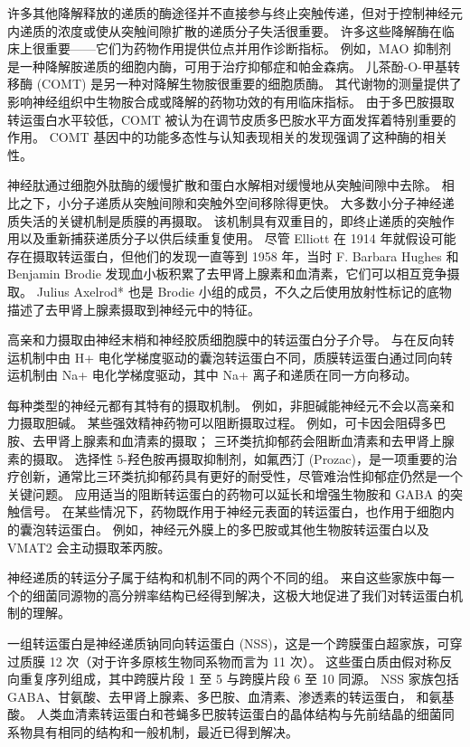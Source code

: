 许多其他降解释放的递质的酶途径并不直接参与终止突触传递，但对于控制神经元内递质的浓度或使从突触间隙扩散的递质分子失活很重要。 
许多这些降解酶在临床上很重要——它们为药物作用提供位点并用作诊断指标。 
例如，MAO 抑制剂是一种降解胺递质的细胞内酶，可用于治疗抑郁症和帕金森病。 
儿茶酚-O-甲基转移酶 (COMT) 是另一种对降解生物胺很重要的细胞质酶。 
其代谢物的测量提供了影响神经组织中生物胺合成或降解的药物功效的有用临床指标。 由于多巴胺摄取转运蛋白水平较低，COMT 被认为在调节皮质多巴胺水平方面发挥着特别重要的作用。 
COMT 基因中的功能多态性与认知表现相关的发现强调了这种酶的相关性。


神经肽通过细胞外肽酶的缓慢扩散和蛋白水解相对缓慢地从突触间隙中去除。 
相比之下，小分子递质从突触间隙和突触外空间移除得更快。 
大多数小分子神经递质失活的关键机制是质膜的再摄取。 
该机制具有双重目的，即终止递质的突触作用以及重新捕获递质分子以供后续重复使用。 
尽管 Elliott 在 1914 年就假设可能存在摄取转运蛋白，但他们的发现一直等到 1958 年，当时 F. Barbara Hughes 和 Benjamin Brodie 发现血小板积累了去甲肾上腺素和血清素，它们可以相互竞争摄取。 
Julius Axelrod* 也是 Brodie 小组的成员，不久之后使用放射性标记的底物描述了去甲肾上腺素摄取到神经元中的特征。


高亲和力摄取由神经末梢和神经胶质细胞膜中的转运蛋白分子介导。 
与在反向转运机制中由 H+ 电化学梯度驱动的囊泡转运蛋白不同，质膜转运蛋白通过同向转运机制由 Na+ 电化学梯度驱动，其中 Na+ 离子和递质在同一方向移动。


每种类型的神经元都有其特有的摄取机制。 
例如，非胆碱能神经元不会以高亲和力摄取胆碱。 
某些强效精神药物可以阻断摄取过程。 
例如，可卡因会阻碍多巴胺、去甲肾上腺素和血清素的摄取； 三环类抗抑郁药会阻断血清素和去甲肾上腺素的摄取。 
选择性 5-羟色胺再摄取抑制剂，如氟西汀 (Prozac)，是一项重要的治疗创新，通常比三环类抗抑郁药具有更好的耐受性，尽管难治性抑郁症仍然是一个关键问题。 
应用适当的阻断转运蛋白的药物可以延长和增强生物胺和 GABA 的突触信号。 
在某些情况下，药物既作用于神经元表面的转运蛋白，也作用于细胞内的囊泡转运蛋白。 
例如，神经元外膜上的多巴胺或其他生物胺转运蛋白以及 VMAT2 会主动摄取苯丙胺。


神经递质的转运分子属于结构和机制不同的两个不同的组。 
来自这些家族中每一个的细菌同源物的高分辨率结构已经得到解决，这极大地促进了我们对转运蛋白机制的理解。


一组转运蛋白是神经递质钠同向转运蛋白 (NSS)，这是一个跨膜蛋白超家族，可穿过质膜 12 次（对于许多原核生物同系物而言为 11 次）。 
这些蛋白质由假对称反向重复序列组成，其中跨膜片段 1 至 5 与跨膜片段 6 至 10 同源。
NSS 家族包括 GABA、甘氨酸、去甲肾上腺素、多巴胺、血清素、渗透素的转运蛋白， 和氨基酸。 
人类血清素转运蛋白和苍蝇多巴胺转运蛋白的晶体结构与先前结晶的细菌同系物具有相同的结构和一般机制，最近已得到解决。


